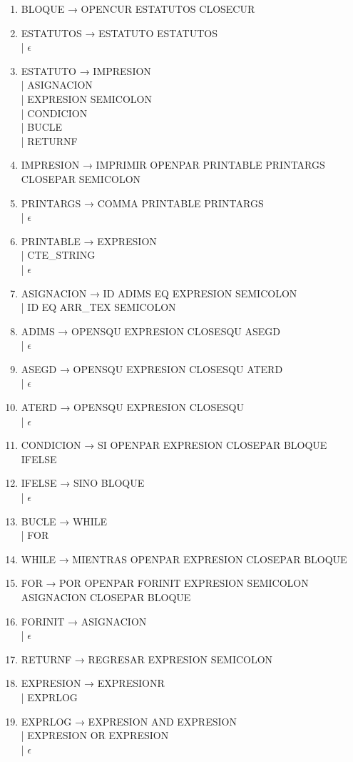 {\begin{enumerate}
    \item BLOQUE → OPENCUR ESTATUTOS CLOSECUR
    \item ESTATUTOS → ESTATUTO ESTATUTOS \\ | $\epsilon$
    \item ESTATUTO → IMPRESION \\ | ASIGNACION \\ | EXPRESION SEMICOLON \\ | CONDICION \\ | BUCLE \\ | RETURNF
    \item IMPRESION → IMPRIMIR OPENPAR PRINTABLE PRINTARGS CLOSEPAR SEMICOLON                   
    \item PRINTARGS → COMMA PRINTABLE PRINTARGS \\ | $\epsilon$
    \item PRINTABLE → EXPRESION \\ | CTE\_STRING \\ |  $\epsilon$   
    \item ASIGNACION → ID ADIMS EQ EXPRESION  SEMICOLON \\ | ID EQ ARR\_TEX SEMICOLON
    \item ADIMS → OPENSQU EXPRESION CLOSESQU ASEGD \\ | $\epsilon$
    \item ASEGD → OPENSQU EXPRESION CLOSESQU ATERD \\ | $\epsilon$             
    \item ATERD → OPENSQU EXPRESION CLOSESQU \\ | $\epsilon$
    \item CONDICION → SI OPENPAR EXPRESION CLOSEPAR BLOQUE IFELSE
    \item IFELSE → SINO BLOQUE \\ | $\epsilon$
    \item BUCLE → WHILE \\ | FOR
    \item WHILE → MIENTRAS OPENPAR EXPRESION CLOSEPAR BLOQUE
    \item FOR → POR OPENPAR FORINIT EXPRESION SEMICOLON ASIGNACION CLOSEPAR BLOQUE
    \item FORINIT → ASIGNACION \\ | $\epsilon$
    \item RETURNF → REGRESAR EXPRESION SEMICOLON
    \item EXPRESION → EXPRESIONR \\ | EXPRLOG
    \item EXPRLOG → EXPRESION AND EXPRESION \\ | EXPRESION OR EXPRESION \\ | $\epsilon$

\end{enumerate}}
